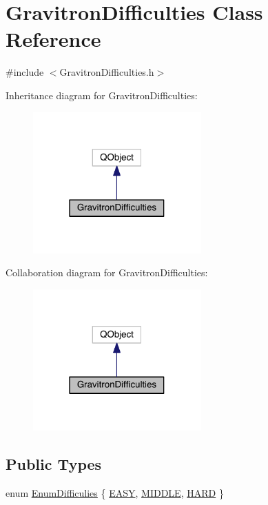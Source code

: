 \hypertarget{class_gravitron_difficulties}{\section{Gravitron\+Difficulties Class Reference}
\label{class_gravitron_difficulties}
}


{\ttfamily \#include $<$Gravitron\+Difficulties.\+h$>$}



Inheritance diagram for Gravitron\+Difficulties\+:\nopagebreak
\begin{figure}[H]
\begin{center}
\leavevmode
\includegraphics[width=183pt]{class_gravitron_difficulties__inherit__graph}
\end{center}
\end{figure}


Collaboration diagram for Gravitron\+Difficulties\+:\nopagebreak
\begin{figure}[H]
\begin{center}
\leavevmode
\includegraphics[width=183pt]{class_gravitron_difficulties__coll__graph}
\end{center}
\end{figure}
\subsection*{Public Types}
\begin{DoxyCompactItemize}
\item 
enum \hyperlink{class_gravitron_difficulties_a750335ce46507e59ed2920c727961a7c}{Enum\+Difficulies} \{ \hyperlink{class_gravitron_difficulties_a750335ce46507e59ed2920c727961a7ca5d10ab2ad81fb31656419749c3fe8d8e}{E\+A\+S\+Y}, 
\hyperlink{class_gravitron_difficulties_a750335ce46507e59ed2920c727961a7ca042903b48121b0977d01e2434590000b}{M\+I\+D\+D\+L\+E}, 
\hyperlink{class_gravitron_difficulties_a750335ce46507e59ed2920c727961a7ca6749d46a3ece9db0bd0f2b0888495617}{H\+A\+R\+D}
 \}
\end{DoxyCompactItemize}


